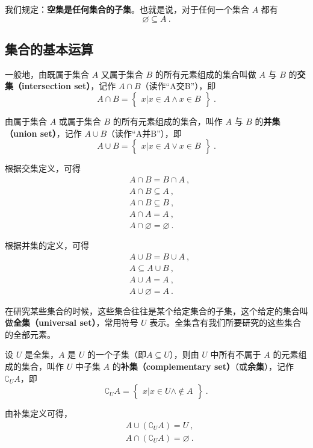 我们规定：\textbf{空集是任何集合的子集}。也就是说，对于任何一个集合 $A$ 都有
\begin{equation}
\varnothing \subseteq A~.
\end{equation}

\subsection{集合的基本运算}
一般地，由既属于集合 $A$ 又属于集合 $B$ 的所有元素组成的集合叫做 $A$ 与 $B$ 的\textbf{交集（intersection set）}，记作 $A \cap B$（读作“A交B”），即
\begin{equation}
A\cap B = \begin{Bmatrix} x|x\in A \wedge x\in B \end{Bmatrix}~.
\end{equation}

由属于集合 $A$ 或属于集合 $B$ 的所有元素组成的集合，叫作 $A$ 与 $B$ 的\textbf{并集（union set）}，记作 $A\cup B$（读作“A并B”），即
\begin{equation}
A\cup B = \begin{Bmatrix}x|x\in A \vee x\in B\end{Bmatrix}~.
\end{equation}

根据交集定义，可得
\begin{equation}
\begin{aligned}
&A\cap B = B\cap A~, \\ 
&A\cap B \subseteq A ~,\\
&A\cap B \subseteq B~, \\
&A\cap A = A ~,\\
&A\cap \varnothing = \varnothing~.
\end{aligned}
\end{equation}

根据并集的定义，可得
\begin{equation}
\begin{aligned}
&A\cup B = B\cup A~, \\
&A\subseteq A\cup B ~,\\
&A\cup A = A ~,\\
&A\cup \varnothing = A~.
\end{aligned}
\end{equation}

在研究某些集合的时候，这些集合往往是某个给定集合的子集，这个给定的集合叫做\textbf{全集（universal set）}，常用符号 $U$ 表示。全集含有我们所要研究的这些集合的全部元素。

设 $U$ 是全集，$A$ 是 $U$ 的一个子集（即$A\subseteq U$），则由 $U$ 中所有不属于 $A$ 的元素组成的集合，叫作 $U$ 中子集 $A$ 的\textbf{补集（complementary set）}（或\textbf{余集}），记作$\complement_UA$，即
\begin{equation}
\complement_UA = \begin{Bmatrix}x|x\in U \wedge \notin A\end{Bmatrix}~.
\end{equation}

由补集定义可得，
\begin{equation}
\begin{aligned}
&A\cup (\complement_UA) = U~, \\
&A\cap (\complement_UA) = \varnothing~.
\end{aligned}
\end{equation}
